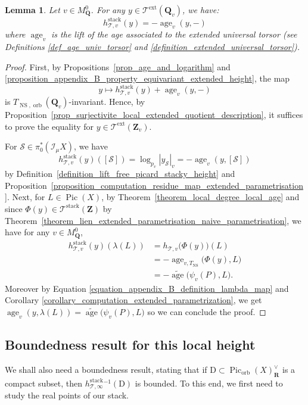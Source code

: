 \documentclass{proc-l}
\newcommand{\R}{\mathbf{R}}
\newcommand{\Z}{\mathbf{Z}}
\newcommand{\Q}{\mathbf{Q}}
\DeclareMathOperator{\Pic}{Pic}
\DeclareMathOperator{\stack}{stack}
\DeclareMathOperator{\age}{age}
\DeclareMathOperator{\NS}{NS}
\DeclareMathOperator{\orb}{orb}
\DeclareMathOperator{\ext}{ext}
\newcommand{\stackS}{\mathcal{S}}
\newcommand{\stackT}{\mathcal{T}}
\newcommand{\sheafI}{\mathcal{I}}
\newcommand{\twistsector}{\pi_0^*(\sheafI_{\mu} X)}
\newtheorem{lemma}[theorem]{Lemma}
\theoremstyle{definition}
\theoremstyle{remark}
\numberwithin{equation}{section}
\begin{document}
\begin{lemma}\label{lemma_appendix_b_computation_naive_height_finite_place}
Let  $v \in M_{\Q}^0$. For any $y \in \stackT^{\ext}(\Q_v)$, we have:
$$h_{\stackT,v}^{\stack}(y) = - \age_v(y,-) $$where $\age_v$ is the lift of the age associated to the extended universal torsor (see Definitions \ref{def_age_univ_torsor} and \ref{definition_extended_universal_torsor}). 
\end{lemma}


\begin{proof}
First, by Propositions~\ref{prop_age_and_logarithm} and \ref{proposition_appendix_B_property_equivariant_extended_height}, the map
\[
    y \mapsto h_{\stackT,v}^{\stack}(y) + \age_v(y,-)
\]is $T_{\NS,\orb}(\Q_v)$-invariant. Hence, by Proposition~\ref{prop_surjectivite_local_extended_quotient_description}, it suffices to prove the equality for $y \in \stackT^{\ext}(\Z_v)$.

For $\stackS \in \twistsector$, we have
\[
    h_{\stackT,v}^{\stack}(y)([\stackS]) = \log_{p_v} |y_{\stackS}|_v = - \age_v(y,[\stackS])
\]by Definition~\ref{definition_lift_free_picard_stacky_height} and Proposition~\ref{proposition_computation_residue_map_extended_parametrisation}. Next, for $L \in \Pic(X)$, by Theorem~\ref{theorem_local_degree_local_age} and since $\Phi(y) \in \stackT^{\stack}(\Z)$ by Theorem~\ref{theorem_lien_extended_parametrisation_naive_parametrisation}, we have for any $v \in M_{\Q}^{0}$,
\begin{align*}
h_{\stackT,v}^{\stack}(y)(\lambda(L))&= h_{\stackT,v}\bigl(\Phi(y)\bigr)(L) \\
&= - \age_{v,T_{\NS}}\bigl(\Phi(y),L\bigr) \\
&= - \widetilde{\age}\bigl(\psi_v(P),L\bigr).   
\end{align*}Moreover by Equation \eqref{equation_appendix_B_definition_lambda_map} and Corollary \ref{corollary_computation_extended_parametrization}, we get $\age_v(y,\lambda(L)) = \widetilde{\age}\bigl(\psi_v(P),L\bigr)$ so we can conclude the proof.
    

\end{proof}



\subsection{Boundedness result for this local height}\label{section_appendix_B_boundedness}

We shall also need a boundedness result, stating that if $\mathrm{D} \subset
\Pic_{\orb}(X)^{\vee}_{\R}$ is a compact subset, then
$h^{\stack}_{\stackT,\infty}{}^{-1}(\mathrm{D})$ is bounded. To this end, we first need to study
the real points of our stack. 
\end{document}
